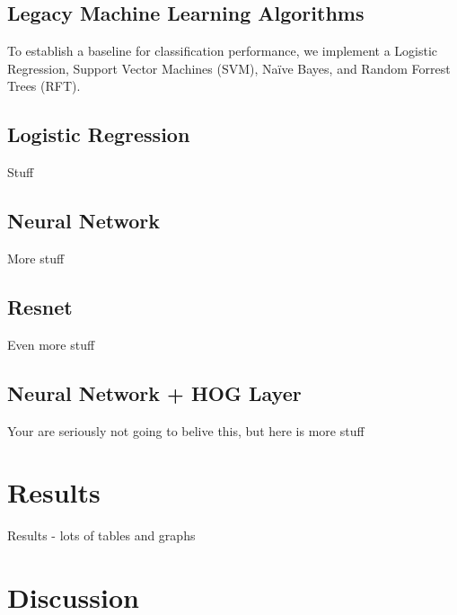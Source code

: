 \documentclass{article}
\begin{document}
\subsection{\label{sec:level2}Legacy Machine Learning Algorithms}
To establish a baseline for classification performance, we implement a Logistic Regression, Support Vector Machines (SVM), Naïve Bayes, and Random Forrest Trees (RFT).


\subsection{\label{sec:level2}Logistic Regression}

Stuff

\subsection{\label{sec:level2}Neural Network}

More stuff

\subsection{\label{sec:level2}Resnet}

Even more stuff

\subsection{\label{sec:level2}Neural Network + HOG Layer}

Your are seriously not going to belive this, but here is more stuff






\section{Results}

Results - lots of tables and graphs


\section{Discussion}
\end{document}
